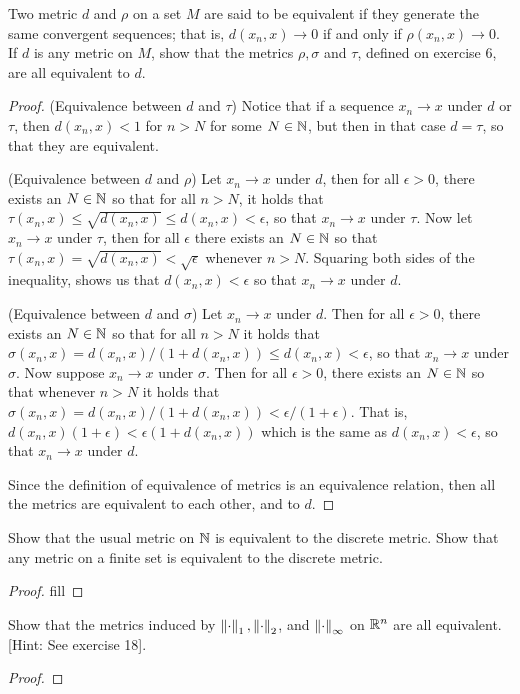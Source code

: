 \begin{exercise}{42}
Two metric $d$ and $\rho$ on a set $M$ are said to be equivalent if they generate the same convergent sequences; that is, $d(x_n,x)\to 0$ if and only if $\rho(x_n,x)\to 0$. If $d$ is any metric on $M$, show that the metrics $\rho,\sigma$ and $\tau$, defined on exercise 6, are all equivalent to $d$.
\end{exercise}
\begin{proof}
(Equivalence between $d$ and $\tau$) Notice that if a sequence $x_n\to x$ under $d$ or $\tau$, then $d(x_n,x)<1$ for $n>N$ for some $N\in\mathbb{N}$, but then in that case $d=\tau$, so that they are equivalent.

(Equivalence between $d$ and $\rho$) Let $x_n\to x$ under $d$, then for all $\epsilon>0$, there exists an $N\in\mathbb{N}$ so that for all $n>N$, it holds that $\tau(x_n,x)\leq \sqrt{d(x_n,x)}\leq d(x_n,x)<\epsilon$, so that $x_n\to x$ under $\tau$. Now let $x_n\to x$ under $\tau$, then for all $\epsilon$ there exists an $N\in\mathbb{N}$ so that $\tau(x_n,x) =\sqrt{d(x_n,x)} <\sqrt{\epsilon}$ whenever $n>N$. Squaring both sides of the inequality, shows us that $d(x_n,x)<\epsilon$ so that $x_n\to x$ under $d$.

(Equivalence between $d$ and $\sigma$) Let $x_n\to x$ under $d$. Then for all $\epsilon>0$, there exists an $N\in\mathbb{N}$ so that for all $n>N$ it holds that $\sigma(x_n,x) =d(x_n,x)/(1+d(x_n,x)) \leq d(x_n,x) <\epsilon$, so that $x_n\to x$ under $\sigma$. Now suppose $x_n\to x$ under $\sigma$. Then for all $\epsilon>0$, there exists an $N\in\mathbb{N}$ so that whenever $n>N$ it holds that $\sigma(x_n,x) =d(x_n,x)/(1+d(x_n,x)) <\epsilon/(1+\epsilon)$. That is, $d(x_n,x)(1+\epsilon)<\epsilon(1+d(x_n,x))$ which is the same as $d(x_n,x)<\epsilon$, so that $x_n\to x$ under $d$. 

Since the definition of equivalence of metrics is an equivalence relation, then all the metrics are equivalent to each other, and to $d$.
\end{proof} 

\begin{exercise}{43}
Show that the usual metric on $\mathbb{N}$ is equivalent to the discrete metric. Show that any metric on a finite set is equivalent to the discrete metric.
\end{exercise}
\begin{proof}
fill
\end{proof} 

\begin{exercise}{44}
Show that the metrics induced by $\left\lVert \cdot\right\rVert_1,\left\lVert \cdot\right\rVert_2$, and $\left\lVert \cdot\right\rVert_\infty$ on $\mathbb{R}^n$ are all equivalent. [Hint: See exercise 18].
\end{exercise}
\begin{proof}
\end{proof} 

